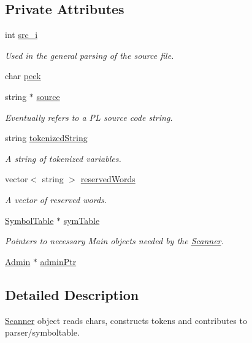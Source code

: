 \subsection*{Private Attributes}
\begin{DoxyCompactItemize}
\item 
int \hyperlink{classScanner_ae8004b082846221da9bbd8affc02bf2b}{src\_\-i}
\begin{DoxyCompactList}\small\item\em Used in the general parsing of the source file. \end{DoxyCompactList}\item 
char \hyperlink{classScanner_a43b06598feabe08732abf86997cafa68}{peek}
\item 
string $\ast$ \hyperlink{classScanner_ab440d28734316634c3e957771468e7db}{source}
\begin{DoxyCompactList}\small\item\em Eventually refers to a PL source code string. \end{DoxyCompactList}\item 
string \hyperlink{classScanner_ab9502fbbd4851a25aec126093247ec6e}{tokenizedString}
\begin{DoxyCompactList}\small\item\em A string of tokenized variables. \end{DoxyCompactList}\item 
vector$<$ string $>$ \hyperlink{classScanner_afebea0f2ae1f1d0df1036a3a9c1a42df}{reservedWords}
\begin{DoxyCompactList}\small\item\em A vector of reserved words. \end{DoxyCompactList}\item 
\hyperlink{classSymbolTable}{SymbolTable} $\ast$ \hyperlink{classScanner_a9b0471200485b0ab6d368c93ad718229}{symTable}
\begin{DoxyCompactList}\small\item\em Pointers to necessary Main objects needed by the \hyperlink{classScanner}{Scanner}. \end{DoxyCompactList}\item 
\hyperlink{classAdmin}{Admin} $\ast$ \hyperlink{classScanner_a05dbf851548561062953e9b1f235a349}{adminPtr}
\end{DoxyCompactItemize}


\subsection{Detailed Description}
\hyperlink{classScanner}{Scanner} object reads chars, constructs tokens and contributes to parser/symboltable. 

